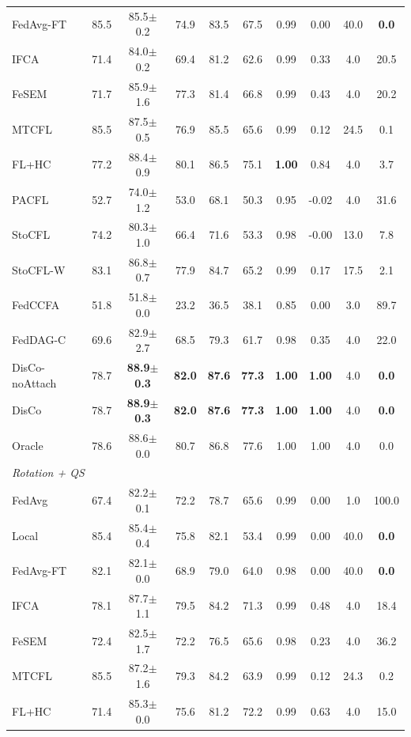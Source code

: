 \begin{tabular}{lccccccccc}
FedAvg-FT & 85.5 & 85.5$\pm$0.2 & 74.9 & 83.5 & 67.5 & 0.99 & 0.00 & 40.0 & \textbf{0.0} \\
IFCA & 71.4 & 84.0$\pm$0.2 & 69.4 & 81.2 & 62.6 & 0.99 & 0.33 & 4.0 & 20.5 \\
FeSEM & 71.7 & 85.9$\pm$1.6 & 77.3 & 81.4 & 66.8 & 0.99 & 0.43 & 4.0 & 20.2 \\
MTCFL & 85.5 & 87.5$\pm$0.5 & 76.9 & 85.5 & 65.6 & 0.99 & 0.12 & 24.5 & 0.1 \\
FL+HC & 77.2 & 88.4$\pm$0.9 & 80.1 & 86.5 & 75.1 & \textbf{1.00} & 0.84 & 4.0 & 3.7 \\
PACFL & 52.7 & 74.0$\pm$1.2 & 53.0 & 68.1 & 50.3 & 0.95 & -0.02 & 4.0 & 31.6 \\
StoCFL & 74.2 & 80.3$\pm$1.0 & 66.4 & 71.6 & 53.3 & 0.98 & -0.00 & 13.0 & 7.8 \\
StoCFL-W & 83.1 & 86.8$\pm$0.7 & 77.9 & 84.7 & 65.2 & 0.99 & 0.17 & 17.5 & 2.1 \\
FedCCFA & 51.8 & 51.8$\pm$0.0 & 23.2 & 36.5 & 38.1 & 0.85 & 0.00 & 3.0 & 89.7 \\
FedDAG-C & 69.6 & 82.9$\pm$2.7 & 68.5 & 79.3 & 61.7 & 0.98 & 0.35 & 4.0 & 22.0 \\
DisCo-noAttach & 78.7 & \textbf{88.9$\pm$0.3} & \textbf{82.0} & \textbf{87.6} & \textbf{77.3} & \textbf{1.00} & \textbf{1.00} & 4.0 & \textbf{0.0} \\
DisCo & 78.7 & \textbf{88.9$\pm$0.3} & \textbf{82.0} & \textbf{87.6} & \textbf{77.3} & \textbf{1.00} & \textbf{1.00} & 4.0 & \textbf{0.0} \\
Oracle & 78.6 & 88.6$\pm$0.0 & 80.7 & 86.8 & 77.6 & 1.00 & 1.00 & 4.0 & 0.0 \\
\midrule
\multicolumn{10}{l}{\textit{Rotation + QS}}\\
FedAvg & 67.4 & 82.2$\pm$0.1 & 72.2 & 78.7 & 65.6 & 0.99 & 0.00 & 1.0 & 100.0 \\
Local & 85.4 & 85.4$\pm$0.4 & 75.8 & 82.1 & 53.4 & 0.99 & 0.00 & 40.0 & \textbf{0.0} \\
FedAvg-FT & 82.1 & 82.1$\pm$0.0 & 68.9 & 79.0 & 64.0 & 0.98 & 0.00 & 40.0 & \textbf{0.0} \\
IFCA & 78.1 & 87.7$\pm$1.1 & 79.5 & 84.2 & 71.3 & 0.99 & 0.48 & 4.0 & 18.4 \\
FeSEM & 72.4 & 82.5$\pm$1.7 & 72.2 & 76.5 & 65.6 & 0.98 & 0.23 & 4.0 & 36.2 \\
MTCFL & 85.5 & 87.2$\pm$1.6 & 79.3 & 84.2 & 63.9 & 0.99 & 0.12 & 24.3 & 0.2 \\
FL+HC & 71.4 & 85.3$\pm$0.0 & 75.6 & 81.2 & 72.2 & 0.99 & 0.63 & 4.0 & 15.0 \\

\end{tabular}
